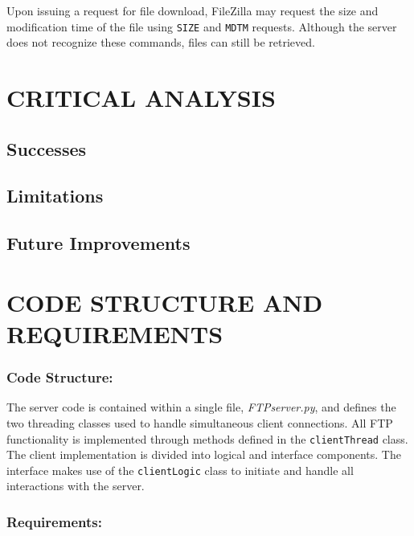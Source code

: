 \documentclass[10pt,twocolumn]{witseiepaper}
\begin{document}
Upon issuing a request for file download, FileZilla may request the size and modification time of the file using \texttt{SIZE} and \texttt{MDTM} requests. Although the server does not recognize these commands, files can still be retrieved.
\section{CRITICAL ANALYSIS}

\subsection{Successes}

\subsection{Limitations}

\subsection{Future Improvements}

\section{CODE STRUCTURE AND REQUIREMENTS}

\subsubsection*{Code Structure: } The server code is contained within a single file, \textit{FTPserver.py}, and defines the two threading classes used to handle simultaneous client connections. All FTP functionality is implemented through methods defined in the \texttt{clientThread} class. The client implementation is divided into logical and interface components. The interface makes use of the \texttt{clientLogic} class to initiate and handle all interactions with the server.  %

\subsubsection*{Requirements: }

\end{document}
